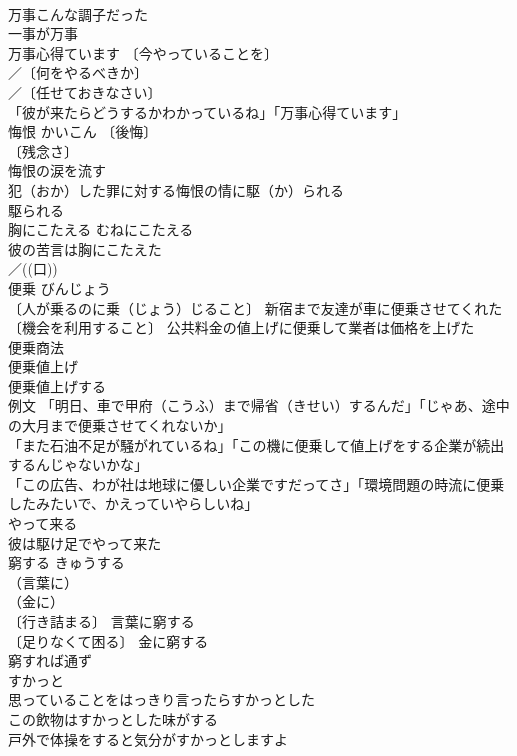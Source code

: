 \documentclass[8pt]{extreport}
\begin{document}
\begin{CJK}{UTF8}{min}
\\	万事こんな調子だった 
\\	一事が万事 
\\	万事心得ています 〔今やっていることを〕
\\	／〔何をやるべきか〕
\\	／〔任せておきなさい〕
\\	「彼が来たらどうするかわかっているね」「万事心得ています」 
\\	悔恨	かいこん	〔後悔〕
\\	〔残念さ〕
\\	悔恨の涙を流す 
\\	犯（おか）した罪に対する悔恨の情に駆（か）られる
\\	駆られる　
\\	胸にこたえる	むねにこたえる	
\\	彼の苦言は胸にこたえた 
\\	／((口)) 
\\	便乗	びんじょう	
\\	〔人が乗るのに乗（じょう）じること〕 新宿まで友達が車に便乗させてくれた 
\\	〔機会を利用すること〕 公共料金の値上げに便乗して業者は価格を上げた 
\\	便乗商法 
\\	便乗値上げ 
\\	便乗値上げする 
\\	例文 「明日、車で甲府（こうふ）まで帰省（きせい）するんだ」「じゃあ、途中の大月まで便乗させてくれないか」 
\\	「また石油不足が騒がれているね」「この機に便乗して値上げをする企業が続出するんじゃないかな」 
\\	「この広告、わが社は地球に優しい企業ですだってさ」「環境問題の時流に便乗したみたいで、かえっていやらしいね」 
\\	やって来る		
\\	彼は駆け足でやって来た 
\\	窮する	きゅうする	
\\	（言葉に）
\\	（金に）
\\	〔行き詰まる〕 言葉に窮する 
\\	〔足りなくて困る〕 金に窮する 
\\	窮すれば通ず 
\\	すかっと		
\\	思っていることをはっきり言ったらすかっとした 
\\	この飲物はすかっとした味がする 
\\	戸外で体操をすると気分がすかっとしますよ 

\end{CJK}
\end{document}
